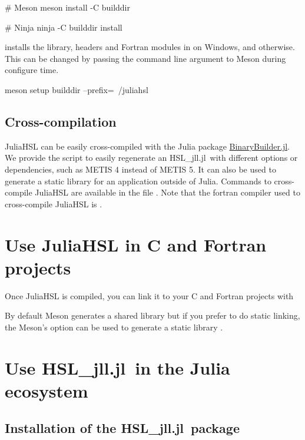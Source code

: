 \documentclass[gdweb]{geradwp}
\newcommand{\HSLjll}{HSL\_jll.jl}
\begin{document}
\begin{jllisting}
# Meson
meson install -C builddir

# Ninja
ninja -C builddir install
\end{jllisting}
installs the library, headers and Fortran modules in  on Windows, and  otherwise.
This can be changed by passing the command line argument  to Meson during configure time.
\begin{jllisting}
meson setup builddir --prefix=~/juliahsl
\end{jllisting}

\subsection{Cross-compilation}

JuliaHSL can be easily cross-compiled with the Julia package \href{https://github.com/JuliaPackaging/BinaryBuilder.jl}{BinaryBuilder.jl}.
We provide the script  to easily regenerate an \HSLjll~with different options or dependencies, such as METIS 4 instead of METIS 5.
It can also be used to generate a static library  for an application outside of Julia.
Commands to cross-compile JuliaHSL are available in the file .
Note that the fortran compiler used to cross-compile JuliaHSL is .

\section{Use JuliaHSL in C and Fortran projects}

Once JuliaHSL is compiled, you can link it to your C and Fortran projects with
By default Meson generates a shared library but if you prefer to do static linking, the Meson's option  can be used to generate a static library .

\section{Use \HSLjll~in the Julia ecosystem}

\subsection{Installation of the \HSLjll~package}
\end{document}
